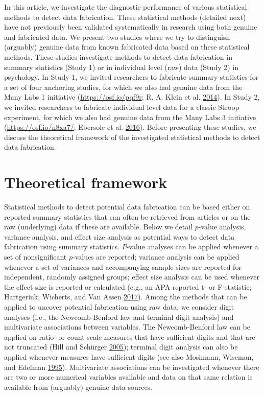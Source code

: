 \documentclass[a5paper]{book}
\begin{document}
In this article, we investigate the diagnostic performance of various
statistical methods to detect data fabrication. These statistical
methods (detailed next) have not previously been validated
systematically in research using both genuine and fabricated data. We
present two studies where we try to distinguish (arguably) genuine data
from known fabricated data based on these statistical methods. These
studies investigate methods to detect data fabrication in summary
statistics (Study 1) or in individual level (raw) data (Study 2) in
psychology. In Study 1, we invited researchers to fabricate summary
statistics for a set of four anchoring studies, for which we also had
genuine data from the Many Labs 1 initiative
(\url{https://osf.io/pqf9r}; R. A. Klein et al.
\protect\hyperlink{ref-doi:10.1027ux2f1864-9335ux2fa000178}{2014}). In
Study 2, we invited researchers to fabricate individual level data for a
classic Stroop experiment, for which we also had genuine data from the
Many Labs 3 initiative (\url{https://osf.io/n8xa7/}; Ebersole et al.
\protect\hyperlink{ref-doi:10.1016ux2fj.jesp.2015.10.012}{2016}). Before
presenting these studies, we discuss the theoretical framework of the
investigated statistical methods to detect data fabrication.

\section{Theoretical framework}\label{theoretical-framework-1}

Statistical methods to detect potential data fabrication can be based
either on reported summary statistics that can often be retrieved from
articles or on the raw (underlying) data if these are available. Below
we detail \(p\)-value analysis, variance analysis, and effect size
analysis as potential ways to detect data fabrication using summary
statistics. \(P\)-value analyses can be applied whenever a set of
nonsignificant \(p\)-values are reported; variance analysis can be
applied whenever a set of variances and accompanying sample sizes are
reported for independent, randomly assigned groups; effect size analysis
can be used whenever the effect size is reported or calculated (e.g., an
APA reported t- or F-statistic; Hartgerink, Wicherts, and Van Assen
\protect\hyperlink{ref-doi:10.1525ux2fcollabra.71}{2017}). Among the
methods that can be applied to uncover potential fabrication using raw
data, we consider digit analyses (i.e., the Newcomb-Benford law and
terminal digit analysis) and multivariate associations between
variables. The Newcomb-Benford law can be applied on ratio- or count
scale measures that have sufficient digits and that are not truncated
(Hill and Schürger
\protect\hyperlink{ref-doi:10.1016ux2fj.spa.2005.05.003}{2005});
terminal digit analysis can also be applied whenever measures have
sufficient digits (see also Mosimann, Wiseman, and Edelman
\protect\hyperlink{ref-doi:10.1080ux2f08989629508573866}{1995}).
Multivariate associations can be investigated whenever there are two or
more numerical variables available and data on that same relation is
available from (arguably) genuine data sources.
\end{document}

